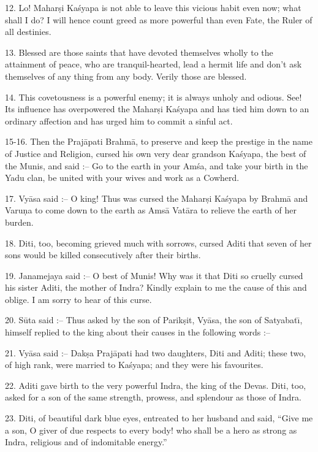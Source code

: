 12. Lo! Mahar\d{s}i Ka\'syapa is not able to leave this vicious habit even now; what shall I do? I will hence count greed as more powerful than even Fate, the Ruler of all destinies.

13. Blessed are those saints that have devoted themselves wholly to the attainment of peace, who are tranquil-hearted, lead a hermit life and don't ask themselves of any thing from any body. Verily those are blessed.

14. This covetousness is a powerful enemy; it is always unholy and odious. See! Its influence has overpowered the Mahar\d{s}i Ka\'syapa and has tied him down to an ordinary affection and has urged him to commit a sinful act.

15-16. Then the Praj\=apati Brahm\=a, to preserve and keep the prestige in the name of Justice and Religion, cursed his own very dear grandson Ka\'syapa, the best of the Munis, and said :-- Go to the earth in your Am\'sa, and take your birth in the Yadu clan, be united with your wives and work as a Cowherd.

17. Vy\=asa said :-- O king! Thus was cursed the Mahar\d{s}i Ka\'syapa by Brahm\=a and Varu\d{n}a to come down to the earth as Ams\=a Vat\=ara to relieve the earth of her burden.

18. Diti, too, becoming grieved much with sorrows, cursed Aditi that seven of her sons would be killed consecutively after their births.

19. Janamejaya said :-- O best of Munis! Why was it that Diti so cruelly cursed his sister Aditi, the mother of Indra? Kindly explain to me the cause of this and oblige. I am sorry to hear of this curse.

20. S\=uta said :-- Thus asked by the son of Parik\d{s}it, Vy\=asa, the son of Satyabat\={\i}, himself replied to the king about their causes in the following words :--

21. Vy\=asa said :-- Dak\d{s}a Praj\=apati had two daughters, Diti and Aditi; these two, of high rank, were married to Ka\'syapa; and they were his favourites.

22. Aditi gave birth to the very powerful Indra, the king of the Devas. Diti, too, asked for a son of the same strength, prowess, and splendour as those of Indra.

23. Diti, of beautiful dark blue eyes, entreated to her husband and said, ``Give me a son, O giver of due respects to every body! who shall be a hero as strong as Indra, religious and of indomitable energy.''


